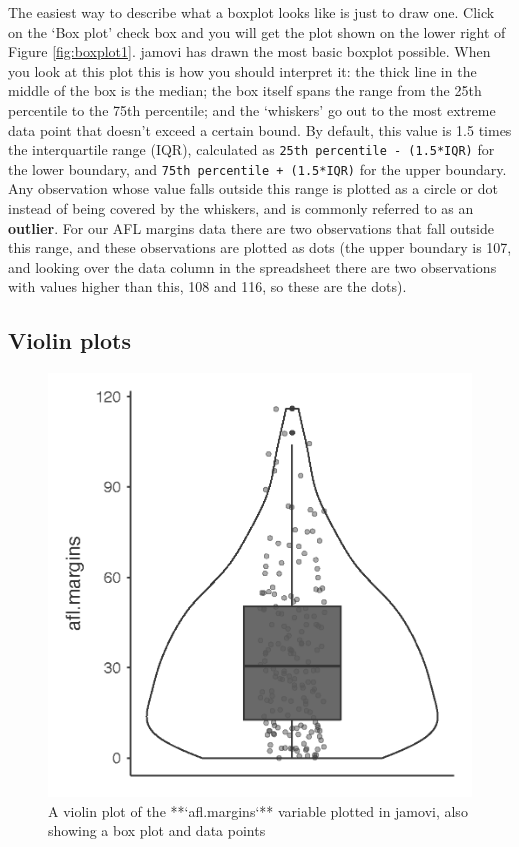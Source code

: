 \documentclass[
]{book}
\begin{document}
The easiest way to describe what a boxplot looks like is just to draw one. Click on the `Box plot' check box and you will get the plot shown on the lower right of Figure \ref{fig:boxplot1}. jamovi has drawn the most basic boxplot possible. When you look at this plot this is how you should interpret it: the thick line in the middle of the box is the median; the box itself spans the range from the 25th percentile to the 75th percentile; and the `whiskers' go out to the most extreme data point that doesn't exceed a certain bound. By default, this value is 1.5 times the interquartile range (IQR), calculated as \texttt{25th\ percentile\ -\ (1.5*IQR)} for the lower boundary, and \texttt{75th\ percentile\ +\ (1.5*IQR)} for the upper boundary. Any observation whose value falls outside this range is plotted as a circle or dot instead of being covered by the whiskers, and is commonly referred to as an {\textbf{outlier}}. For our AFL margins data there are two observations that fall outside this range, and these observations are plotted as dots (the upper boundary is 107, and looking over the data column in the spreadsheet there are two observations with values higher than this, 108 and 116, so these are the dots).

\hypertarget{violinplots}{%
\subsection{Violin plots}\label{violinplots}}

\begin{figure}

{\centering \includegraphics[width=1\linewidth]{img/graphics/boxplot2} 

}

\caption{A violin plot of the **`afl.margins`** variable plotted in jamovi, also showing a box plot and data points}\label{fig:boxplot2}
\end{figure}
\end{document}
